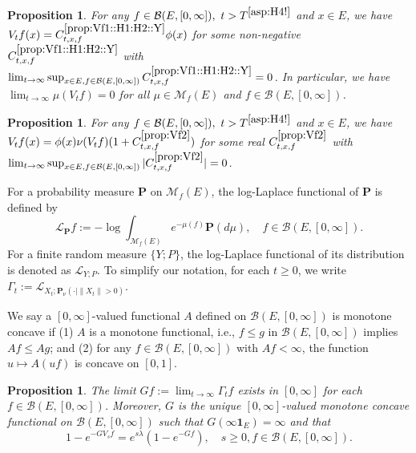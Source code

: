 \documentclass[12pt,a4paper]{amsart}
\numberwithin{equation}{section}
\theoremstyle{plain}
\newtheorem{prop}[thm]{Proposition}
\theoremstyle{definition}
\theoremstyle{remark}
\begin{document}
\begin{prop} \label{prop:Vf1::H1:H2::Y}
	For any $f\in \mathcal B(E, [0,\infty]),~t > T^{\eqref{asp:H4!}}$ and $x\in E$, we have $V_tf(x) = C^{\ref{prop:Vf1::H1:H2::Y}}_{t,x,f} \phi(x)$ for some non-negative $C_{t,x,f}^{\ref{prop:Vf1::H1:H2::Y}}$ with $\lim_{t\to \infty} \sup_{x\in E, f\in \mathcal B(E, [0,\infty])}  C^{\ref{prop:Vf1::H1:H2::Y}}_{t,x,f} = 0$.
	In particular, we have $\lim_{t\to \infty} \mu(V_tf)= 0 $ for all $\mu \in \mathcal M_f(E)$ and $f\in \mathcal B(E,[0,\infty])$.
\end{prop}

\begin{prop} \label{prop:Vf2}
	For any $f\in \mathcal B(E,[0,\infty]),~t>T^{\eqref{asp:H4!}}$ and $x\in E$, we have $V_tf(x) = \phi(x) \nu (V_tf) (1+C^{\ref{prop:Vf2}}_{t,x,f}) $ for some real $C^{\ref{prop:Vf2}}_{t,x,f}$ with
$\lim_{t\to \infty} \sup_{x\in E, f\in \mathcal B(E, [0,\infty])} |C^{\ref{prop:Vf2}}_{t,x,f}| = 0$.
\end{prop}

	For a probability measure $\mathbf P$ on $\mathcal M_f(E)$,
    the log-Laplace functional of $\mathbf P$ is defined by
	\[
	\mathscr L_\mathbf P f := - \log \int_{\mathcal M_f(E)}  e^{-\mu(f)} \mathbf P(d\mu), \quad
	f\in \mathcal B(E,[0,\infty]).
	\]
	For a finite random measure $\{Y; P\}$, the log-Laplace functional of its distribution is denoted as $\mathscr L_{Y;P}$.
	To simplify our notation, for each $t\geq 0$, we write $\Gamma_t := \mathscr L_{X_t;\mathbf P_\nu(\cdot | \|X_t\|>0)}$.

	We say a $[0,\infty]$-valued functional $A$ defined on $\mathcal B(E,[0,\infty])$ is monotone concave if
	(1) $A$ is a monotone functional, i.e., $f\leq g$ in $\mathcal B(E,[0,\infty])$ implies $Af \leq Ag$; and
	(2) for any $f\in \mathcal B(E,[0,\infty])$ with $Af< \infty$, the function $u \mapsto A(uf)$ is concave on $[0,1]$.

\begin{prop} \label{prop:G}
	The limit $Gf:= \lim_{t\to \infty} \Gamma_t f$ exists in $[0,\infty]$ for each $f\in \mathcal B(E,[0,\infty])$.
	Moreover, $G$ is the unique $[0,\infty]$-valued monotone concave functional on $\mathcal B(E,[0,\infty])$ such that
	$G(\infty  \mathbf 1_E) = \infty$ and that
\begin{equation} \label{eq:G.0}
	1 - e^{- GV_s f}
	= e^{s\lambda} (1 - e^{-Gf}),
	\quad s\geq 0, f\in \mathcal B(E,[0,\infty]).
\end{equation}
\end{prop}
\end{document}
